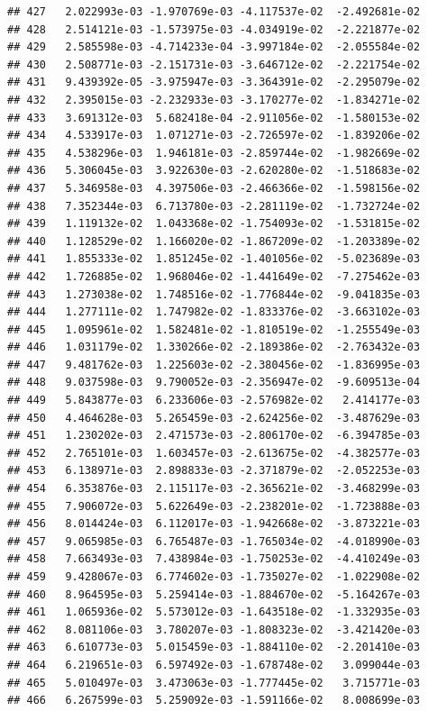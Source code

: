 \documentclass[
]{article}
\begin{document}
\begin{verbatim}
## 427   2.022993e-03 -1.970769e-03 -4.117537e-02  -2.492681e-02
## 428   2.514121e-03 -1.573975e-03 -4.034919e-02  -2.221877e-02
## 429   2.585598e-03 -4.714233e-04 -3.997184e-02  -2.055584e-02
## 430   2.508771e-03 -2.151731e-03 -3.646712e-02  -2.221754e-02
## 431   9.439392e-05 -3.975947e-03 -3.364391e-02  -2.295079e-02
## 432   2.395015e-03 -2.232933e-03 -3.170277e-02  -1.834271e-02
## 433   3.691312e-03  5.682418e-04 -2.911056e-02  -1.580153e-02
## 434   4.533917e-03  1.071271e-03 -2.726597e-02  -1.839206e-02
## 435   4.538296e-03  1.946181e-03 -2.859744e-02  -1.982669e-02
## 436   5.306045e-03  3.922630e-03 -2.620280e-02  -1.518683e-02
## 437   5.346958e-03  4.397506e-03 -2.466366e-02  -1.598156e-02
## 438   7.352344e-03  6.713780e-03 -2.281119e-02  -1.732724e-02
## 439   1.119132e-02  1.043368e-02 -1.754093e-02  -1.531815e-02
## 440   1.128529e-02  1.166020e-02 -1.867209e-02  -1.203389e-02
## 441   1.855333e-02  1.851245e-02 -1.401056e-02  -5.023689e-03
## 442   1.726885e-02  1.968046e-02 -1.441649e-02  -7.275462e-03
## 443   1.273038e-02  1.748516e-02 -1.776844e-02  -9.041835e-03
## 444   1.277111e-02  1.747982e-02 -1.833376e-02  -3.663102e-03
## 445   1.095961e-02  1.582481e-02 -1.810519e-02  -1.255549e-03
## 446   1.031179e-02  1.330266e-02 -2.189386e-02  -2.763432e-03
## 447   9.481762e-03  1.225603e-02 -2.380456e-02  -1.836995e-03
## 448   9.037598e-03  9.790052e-03 -2.356947e-02  -9.609513e-04
## 449   5.843877e-03  6.233606e-03 -2.576982e-02   2.414177e-03
## 450   4.464628e-03  5.265459e-03 -2.624256e-02  -3.487629e-03
## 451   1.230202e-03  2.471573e-03 -2.806170e-02  -6.394785e-03
## 452   2.765101e-03  1.603457e-03 -2.613675e-02  -4.382577e-03
## 453   6.138971e-03  2.898833e-03 -2.371879e-02  -2.052253e-03
## 454   6.353876e-03  2.115117e-03 -2.365621e-02  -3.468299e-03
## 455   7.906072e-03  5.622649e-03 -2.238201e-02  -1.723888e-03
## 456   8.014424e-03  6.112017e-03 -1.942668e-02  -3.873221e-03
## 457   9.065985e-03  6.765487e-03 -1.765034e-02  -4.018990e-03
## 458   7.663493e-03  7.438984e-03 -1.750253e-02  -4.410249e-03
## 459   9.428067e-03  6.774602e-03 -1.735027e-02  -1.022908e-02
## 460   8.964595e-03  5.259414e-03 -1.884670e-02  -5.164267e-03
## 461   1.065936e-02  5.573012e-03 -1.643518e-02  -1.332935e-03
## 462   8.081106e-03  3.780207e-03 -1.808323e-02  -3.421420e-03
## 463   6.610773e-03  5.015459e-03 -1.884110e-02  -2.201410e-03
## 464   6.219651e-03  6.597492e-03 -1.678748e-02   3.099044e-03
## 465   5.010497e-03  3.473063e-03 -1.777445e-02   3.715771e-03
## 466   6.267599e-03  5.259092e-03 -1.591166e-02   8.008699e-03

\end{verbatim}
\end{document}

